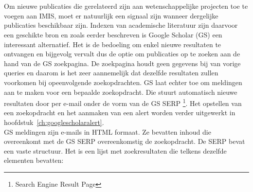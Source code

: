 
\chapter{}%
\label{ch:methodologie}

Om nieuwe publicaties die gerelateerd zijn aan wetenschappelijke projecten toe te voegen aan IMIS, moet er natuurlijk een signaal zijn wanneer dergelijke publicaties beschikbaar zijn. Indexen van academische literatuur zijn daarvoor een geschikte bron en zoals eerder beschreven is Google Scholar (GS) een interessant alternatief. Het is de bedoeling om enkel nieuwe resultaten te ontvangen en bijgevolg vervalt dus de optie om publicaties op te zoeken aan de hand van de GS zoekpagina. De zoekpagina houdt geen gegevens bij van vorige queries en daarom is het zeer aannemelijk dat dezelfde resultaten zullen voorkomen bij opeenvolgende zoekopdrachten. GS laat echter toe om meldingen aan te maken voor een bepaalde zoekopdracht. Die stuurt automatisch nieuwe resultaten door per e-mail onder de vorm van de GS SERP \footnote{Search Engine Result Page}. Het opstellen van een zoekopdracht en het aanmaken van een alert worden verder uitgewerkt in hoofdstuk~\ref{ch:googlescholaralert}.\\
GS meldingen zijn e-mails in HTML formaat. Ze bevatten inhoud die overeenkomt met de GS SERP overeenkomstig de zoekopdracht. De SERP bevat een vaste structuur. Het is een lijst met zoekresultaten die telkens dezelfde elementen bevatten:
